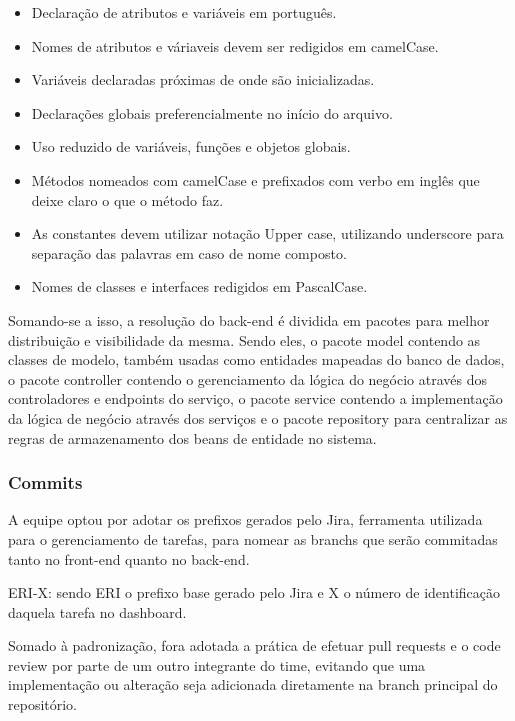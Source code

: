 \documentclass[
    12pt,               %
    openright,          %
    oneside,
    a4paper,            %
    BIBLATEX,           %
    TODO,               %
    english,            %
    brazil              %
    ]{ifsp-spo-inf-ctds}
\begin{document}
        \begin{itemize}
            \item
            Declaração de atributos e variáveis em português.
            \item
            Nomes de atributos e váriaveis devem ser redigidos em camelCase.
            \item
            Variáveis declaradas próximas de onde são inicializadas.
            \item
            Declarações globais preferencialmente no início do arquivo.
            \item
            Uso reduzido de variáveis, funções e objetos globais.
            \item
            Métodos nomeados com camelCase e prefixados com verbo em inglês que deixe claro o que o método faz.
            \item
            As constantes devem utilizar notação Upper case, utilizando underscore para separação das palavras em caso de nome composto.
            \item
            Nomes de classes e interfaces redigidos em PascalCase.
        \end{itemize}

    Somando-se a isso, a resolução do back-end é dividida em pacotes para melhor distribuição e visibilidade da mesma. Sendo eles, o pacote model contendo as classes de modelo, também usadas como entidades mapeadas do banco de dados, o pacote controller contendo o gerenciamento da lógica do negócio através dos controladores e endpoints do serviço, o pacote service contendo a implementação da lógica de negócio através dos serviços e o pacote repository para centralizar as regras de armazenamento dos beans de entidade no sistema.

    \subsubsection{Commits}
    A equipe optou por adotar os prefixos gerados pelo Jira, ferramenta utilizada para o gerenciamento de tarefas, para nomear as branchs que serão commitadas tanto no front-end quanto no back-end.

    ERI-X: sendo ERI o prefixo base gerado pelo Jira e X o número de identificação daquela tarefa no dashboard.

    Somado à padronização, fora adotada a prática de efetuar pull requests e o code review por parte de um outro integrante do time, evitando que uma implementação ou alteração seja adicionada diretamente na branch principal do repositório.
\end{document}
